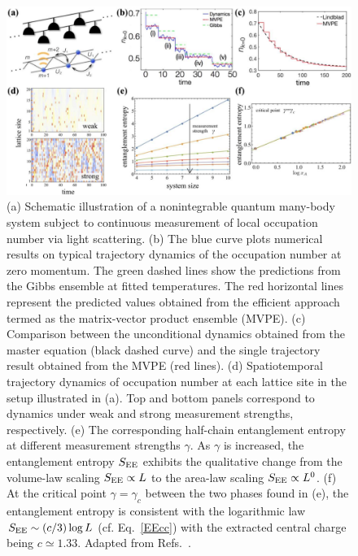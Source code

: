 \documentclass{tADP2e}
\theoremstyle{plain}
\theoremstyle{plain}
\theoremstyle{definition}
\begin{document}
\begin{figure}[t]
\begin{center}
\includegraphics[width=14.5cm]{./Figures/fig_4_heating.pdf}
\end{center}
\caption{(a) Schematic illustration of a nonintegrable quantum many-body system subject to continuous measurement of local occupation number via light scattering. (b) The blue curve plots numerical results on typical trajectory dynamics of the occupation number at zero momentum. The green dashed lines show the predictions from the Gibbs ensemble at fitted temperatures. The red horizontal lines represent the predicted values obtained from the efficient approach termed as the matrix-vector product ensemble (MVPE). (c) Comparison between the unconditional dynamics obtained from the master equation (black dashed curve) and the single trajectory result obtained from the MVPE (red lines). (d) Spatiotemporal trajectory dynamics of occupation number at each lattice site in the setup illustrated in (a). Top and bottom panels correspond to dynamics under weak and strong measurement strengths, respectively. (e) The corresponding half-chain entanglement entropy at different measurement strengths $\gamma$. As $\gamma$ is increased, the entanglement entropy $S_{\rm EE}$ exhibits the qualitative change from the volume-law scaling $S_{\rm EE}\propto L$ to the area-law scaling $S_{\rm EE}\propto L^0$. (f) At the critical point $\gamma=\gamma_c$ between the two phases found in (e), the entanglement entropy is consistent with the logarithmic law $S_{\rm EE}\sim(c/3)\log L$ (cf. Eq.~\eqref{EEcc}) with the extracted central charge being $c\simeq 1.33$. Adapted from Refs.~\cite{YA18therm,YF20}.}
\label{fig:4heating}
\end{figure}
\end{document}
